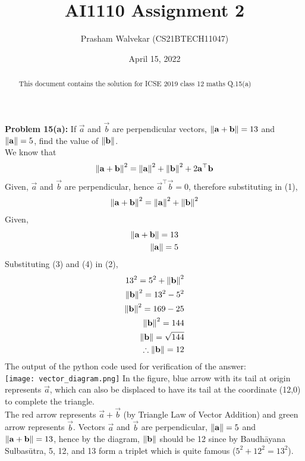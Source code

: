 \documentclass[journal,12pt,twocolumn]{IEEEtran}
\begin{document}
     \def\centbox#1{\makebox[0in]{#1}}
     \def\topbox#1{\raisebox{-\baselineskip}[0in][0in]{#1}}
     \def\midbox#1{\raisebox{-0.5\baselineskip}[0in][0in]{#1}}
\vspace{3cm}
\setlength{\columnsep}{0.70cm}
\title{\Huge{\textbf{AI1110 Assignment 2}}}
\author{Prasham Walvekar (CS21BTECH11047)}
\date{April 15, 2022}
\maketitle
\newpage
\bigskip
\begin{abstract}
This document contains the solution for ICSE 2019 class 12 maths Q.15(a)  
\end{abstract}
\textbf{\large{Problem 15(a):}} \large{If \(\vec{a}\) and \(\vec{b}\) are perpendicular vectors,  $\left\lVert\mathbf{a}+\mathbf{b}\right\rVert  = 13 $ and $\left\lVert\mathbf{a}\right\rVert = 5$, find the value of $\left\lVert\mathbf{b}\right\rVert $.}\\
\solution
We know that
\begin{align}
\left\lVert\mathbf{a}+\mathbf{b}\right\rVert^2 = \left\lVert\mathbf{a}\right\rVert^2 + \left\lVert\mathbf{b}\right\rVert^2 + 2 \mathbf{a}^{\top}\mathbf{b}
\end{align}
Given, $\vec{a}$ and $\vec{b}$ are perpendicular, hence $\vec{a}^{\top}\vec{b}=0$, therefore substituting in (1),
\begin{align}
\left\lVert\mathbf{a}+\mathbf{b}\right\rVert^2 = \left\lVert\mathbf{a}\right\rVert^2 + \left\lVert\mathbf{b}\right\rVert^2
\end{align}
Given,
\begin{align}
\left\lVert\mathbf{a}+\mathbf{b}\right\rVert = 13\\
\left\lVert\mathbf{a}\right\rVert = 5
\end{align}
Substituting (3) and (4) in (2),
\begin{align}
13^2 = 5^2 + \left\lVert\mathbf{b}\right\rVert^2\\
\left\lVert\mathbf{b}\right\rVert^2 = 13^2 - 5^2\\
\left\lVert\mathbf{b}\right\rVert^2 = 169 - 25\\ 
\left\lVert\mathbf{b}\right\rVert^2 = 144\\
\left\lVert\mathbf{b}\right\rVert = \sqrt{144}\\
\therefore \left\lVert\mathbf{b}\right\rVert = 12
\end{align}
The output of the python code used for verification of the answer:\\
\texttt{[image: vector\_diagram.png]}
In the figure, blue arrow with its tail at origin represents $\vec{a}$, which can also be displaced to have its tail at the coordinate (12,0) to complete the triangle.\\
The red arrow represents $\vec{a}+\vec{b}$ (by Triangle Law of Vector Addition) and green arrow represents $\vec{b}$. Vectors $\vec{a}$ and $\vec{b}$ are perpendicular, $\left\lVert\mathbf{a}\right\rVert = 5$ and $\left\lVert\mathbf{a}+\mathbf{b}\right\rVert = 13$, hence by the diagram, $\left\lVert\mathbf{b}\right\rVert$ should be 12 since by Baudhāyana Sulbasūtra, 5, 12, and 13 form a triplet which is quite famous ($5^2+12^2=13^2$).
\end{document}
